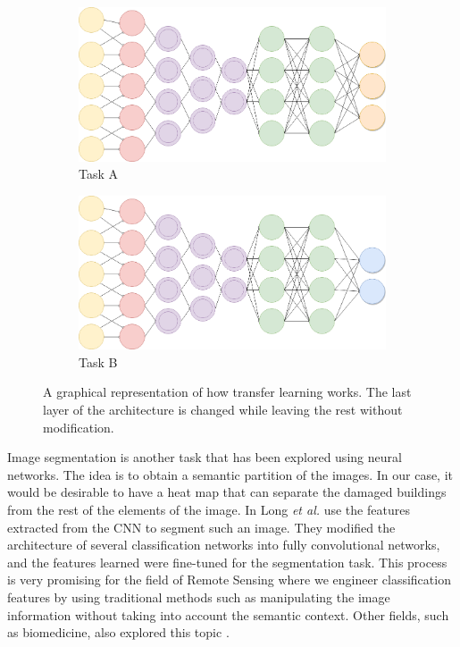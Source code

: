 \begin{figure}[!h]
  \centering
    \begin{subfigure}{.8\textwidth}
        \includegraphics[width=\textwidth]{images/transfer2.png}
        \caption{Task A}
    \end{subfigure}
    \begin{subfigure}{.8\textwidth}
        \includegraphics[width=\textwidth]{images/transfer1.png}
        \caption{Task B}
    \end{subfigure}
  \caption{A graphical representation of how transfer learning works. The last layer of the architecture is changed while leaving the rest without modification.}
  \label{fig:juchitan}
\end{figure}


Image segmentation is another task that has been explored using neural networks. The idea is to obtain a semantic partition of the images. In our case, it would be desirable to have a heat map that can separate the damaged buildings from the rest of the elements of the image. In \cite{DBLP:journals/corr/LongSD14} Long \textit{et al.} use the features extracted from the CNN to segment such an image. They modified the architecture of several classification networks into fully convolutional networks, and the features learned were fine-tuned for the segmentation task. This process is very promising for the field of Remote Sensing where we engineer classification features by using traditional methods such as manipulating the image information without taking into account the semantic context. Other fields, such as biomedicine, also explored this topic \cite{DBLP:journals/corr/RonnebergerFB15}.\\

